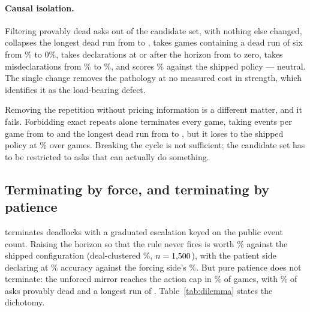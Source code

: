 \paragraph{Causal isolation.} Filtering provably dead asks out of the candidate
set, with nothing else changed, collapses the longest dead run from
\numFilterBaseDeadRun{} to \numFilterDeadRun{}, takes games containing a dead run
of six from \numFilterBaseGames\% to 0\%, takes declarations at or after the
horizon from \numFilterBasePostHorizon{} to zero, takes misdeclarations from \numFilterBaseDeclWrong\% to
\numFilterDeclWrong\%, and scores \numFilterWin\% against the shipped policy ---
neutral. The single change removes the pathology at no measured cost in strength,
which identifies it as the load-bearing defect.

Removing the repetition without pricing information is a different matter, and it
fails. Forbidding exact repeats alone terminates every game, taking events per
game from \numNoRepeatBaseEvents{} to \numNoRepeatEvents{} and the longest dead
run from \numNoRepeatBaseRun{} to \numNoRepeatRun{}, but it loses to the shipped
policy at \numNoRepeatWin\% over \numNoRepeatGames{} games. Breaking the cycle is
not sufficient; the candidate set has to be restricted to asks that can actually
do something.

\subsection{Terminating by force, and terminating by patience}
\label{sec:diag-dilemma}

\vfour{} terminates deadlocks with a graduated escalation keyed on the public
event count. Raising the horizon so that the rule never fires is worth
\numPatientWin\% against the shipped configuration (deal-clustered
\numPatientWinCI\%, $n = 1{,}500$), with the patient side declaring at
\numPatientDeclAcc\% accuracy against the forcing side's \numForcingDeclAcc\%.
But pure patience does not terminate: the unforced mirror reaches the action cap
in \numPatientCap\% of games, with \numPatientDeadAsk\% of asks provably dead and
a longest run of \numPatientDeadRun{}. Table~\ref{tab:dilemma} states the
dichotomy.

